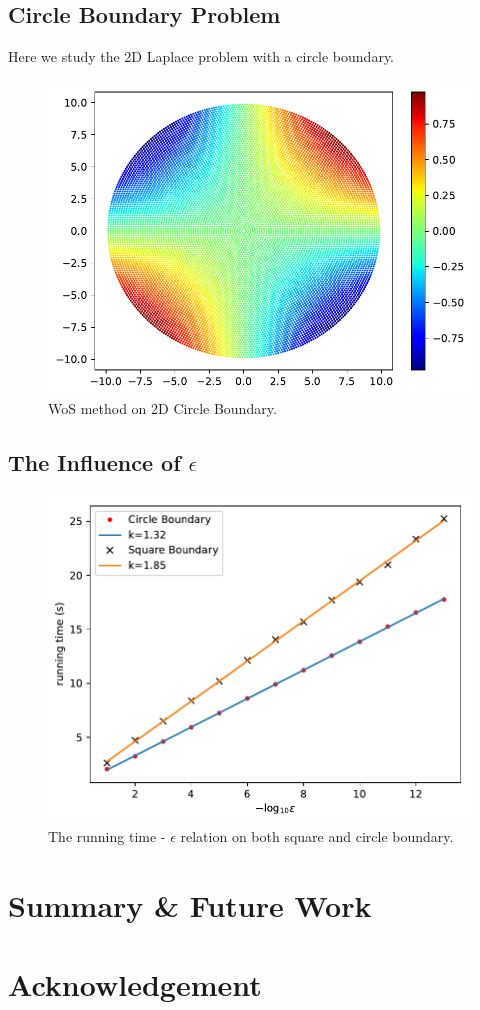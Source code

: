 \documentclass[aps, prl, reprint, groupedaddress]{revtex4-1}
\begin{document}
\subsection{Circle Boundary Problem}

Here we study the 2D Laplace problem with a circle boundary.

\begin{figure}[htbp]
    \centering
    \includegraphics[width=.4\textwidth]{./figs/wos_c}
    \caption{\label{fig:wos_c} WoS method on 2D Circle Boundary.}
\end{figure}

\subsection{The Influence of $\epsilon$}

\begin{figure}[htbp]
    \centering
    \includegraphics[width=.4\textwidth]{./figs/ep_t}
    \caption{\label{fig:ep_t} The running time - $\epsilon$ relation on both square and circle boundary.}
\end{figure}

\section{Summary \& Future Work}



\section{Acknowledgement}


\end{document}
